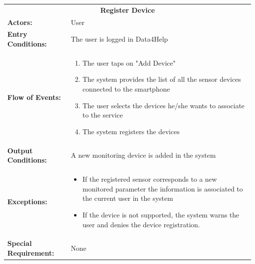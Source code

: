 \begin{table}[htb]
	\centering
	{\renewcommand{\arraystretch}{1.5}%
		\begin{tabular}{|@{\hspace{2em}} p{4cm} @{}| p{11cm} @{\qquad}|}
			\cline{1-2}
			\multicolumn{2}{|c|}{\textbf{Register Device}} \\ \cline{1-2}
			\textbf{Actors:} & User \\ \cline{1-2}
			\textbf{Entry Conditions:} &  The user is logged in Data4Help \\ \cline{1-2}
			\textbf{Flow of Events:} &
			 \begin{enumerate}[itemsep=-0.2em, topsep=0em]
				\item The user taps on "Add Device"
				\item The system provides the list of all the sensor devices connected to the smartphone
				\item The user selects the devices he/she wants to associate to the service
				\item The system registers the devices
			\end{enumerate} \\ \cline{1-2}
			\textbf{Output Conditions:} & A new monitoring device is added in the system \\ \hline
			\textbf{Exceptions:} & 
			\begin{itemize}[itemsep=-0.2em, topsep=-2em, partopsep=-1em]
				\item If the registered sensor corresponds to a new monitored parameter the information is associated to the current user in the system 
				\item If the device is not supported, the system warns the user and denies the device registration.
			\end{itemize} \\ \cline{1-2}
			\textbf{Special Requirement:} & None \\ \hline
	\end{tabular}} \quad
\end{table}

